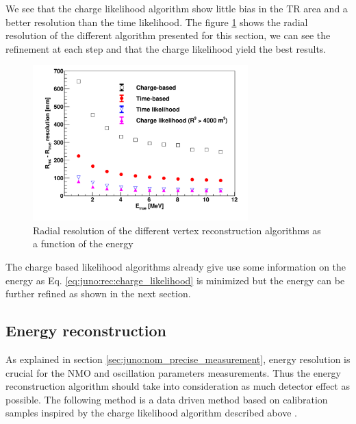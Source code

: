 \documentclass[../main.tex]{subfiles}
\begin{document}
We see that the charge likelihood algorithm show little bias in the TR area and a better resolution than the time likelihood. The figure \ref{fig:juno:rec:all_class} shows the radial resolution of the different algorithm presented for this section, we can see the refinement at each step and that the charge likelihood yield the best results.

\begin{figure}[ht]
  \centering
  \includegraphics[height=6cm]{images/juno/reco/vertex_reco_classique.png}
  \caption{Radial resolution of the different vertex reconstruction algorithms as a function of the energy}
  \label{fig:juno:rec:all_class}
\end{figure}

The charge based likelihood algorithms already give use some information on the energy as Eq. \ref{eq:juno:rec:charge_likelihood} is minimized but the energy can be further refined as shown in the next section.


\subsection{Energy reconstruction}

As explained in section \ref{sec:juno:nom_precise_measurement}, energy resolution is crucial for the NMO and oscillation parameters measurements. Thus the energy reconstruction algorithm should take into consideration as much detector effect as possible. The following method is a data driven method based on calibration samples inspired by the charge likelihood algorithm described above \cite{huang_data-driven_2023}.
\end{document}
